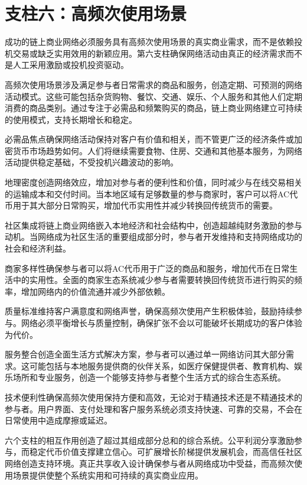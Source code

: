 \documentclass[
  Letterpaper,
]{scrbook}
\begin{document}
\section{支柱六：高频次使用场景}\label{ux652fux67f1ux516dux9ad8ux9891ux6b21ux4f7fux7528ux573aux666f}

成功的链上商业网络必须服务具有高频次使用场景的真实商业需求，而不是依赖投机交易或缺乏实用效用的新颖应用。第六支柱确保网络活动由真正的经济需求而不是人工采用激励或投机投资驱动。

高频次使用场景涉及满足参与者日常需求的商品和服务，创造定期、可预测的网络活动模式。这些可能包括杂货购物、餐饮、交通、娱乐、个人服务和其他人们定期消费的商品类别。通过专注于必需品和频繁购买的商品，链上商业网络建立可持续的使用模式，支持长期增长和稳定。

必需品焦点确保网络活动保持对客户有价值和相关，而不管更广泛的经济条件或加密货币市场趋势如何。人们将继续需要食物、住房、交通和其他基本服务，为网络活动提供稳定基础，不受投机兴趣波动的影响。

地理密度创造网络效应，增加对参与者的便利性和价值，同时减少与在线交易相关的运输成本和交付时间。当本地区域有足够数量的参与商家时，客户可以将AC代币用于其大部分日常购买，增加代币实用性并减少转换回传统货币的需要。

社区集成将链上商业网络嵌入本地经济和社会结构中，创造超越纯财务激励的参与动机。当网络成为社区生活的重要组成部分时，参与者开发维持和支持网络成功的社会和经济利益。

商家多样性确保参与者可以将AC代币用于广泛的商品和服务，增加代币在日常生活中的实用性。全面的商家生态系统减少参与者需要转换回传统货币进行购买的频率，增加网络内的价值流通并减少外部依赖。

质量标准维持客户满意度和网络声誉，确保高频次使用产生积极体验，鼓励持续参与。网络必须平衡增长与质量控制，确保扩张不会以可能破坏长期成功的客户体验为代价。

服务整合创造全面生活方式解决方案，参与者可以通过单一网络访问其大部分需求。这可能包括与本地服务提供商的伙伴关系，如医疗保健提供者、教育机构、娱乐场所和专业服务，创造一个能够支持参与者整个生活方式的综合生态系统。

技术便利性确保高频次使用保持方便和高效，无论对于精通技术还是不精通技术的参与者。用户界面、支付处理和客户服务系统必须支持快速、可靠的交易，不会在日常使用中造成摩擦或延迟。

六个支柱的相互作用创造了超过其组成部分总和的综合系统。公平利润分享激励参与，而稳定代币价值支撑建立信心。可扩展增长阶梯提供发展机会，而高信任社区网络创造支持环境。真正共享收入设计确保参与者从网络成功中受益，而高频次使用场景提供使整个系统实用和可持续的真实商业应用。
\end{document}
